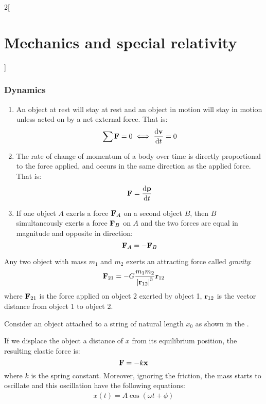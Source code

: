 \documentclass[../../../main_physics.tex]{subfiles}
\begin{document}
\begin{multicols}{2}[\section{Mechanics and special relativity}]
  \subsubsection{Dynamics}
  \begin{law}
    \hfill
    \begin{enumerate}
      \item An object at rest will stay at rest and an object in motion will stay in motion unless acted on by a net external force. That is: $$\sum\boldsymbol{\mathrm{F}}=0\iff\dv{\boldsymbol{\mathrm{v}}}{t}=0$$
      \item The rate of change of momentum of a body over time is directly proportional to the force applied, and occurs in the same direction as the applied force. That is: $$\boldsymbol{\mathrm{F}}=\dv{\boldsymbol{\mathrm{p}}}{t}$$
      \item If one object $A$ exerts a force $\boldsymbol{\mathrm{F}}_A$ on a second object $B$, then $B$ simultaneously exerts a force $\boldsymbol{\mathrm{F}}_B$ on $A$ and the two forces are equal in magnitude and opposite in direction: $$\boldsymbol{\mathrm{F}}_A=-\boldsymbol{\mathrm{F}}_B$$
    \end{enumerate}
  \end{law}
  \begin{proposition}
    Any two object with mass $m_1$ and $m_2$ exerts an attracting force called \emph{gravity}:
    $$\boldsymbol{\mathrm{F}}_{21}=-G\frac{m_1m_2}{{|\boldsymbol{\mathrm{r}}_{12}|}^3}\boldsymbol{\mathrm{r}}_{12}$$
    where $\boldsymbol{\mathrm{F}}_{21}$ is the force applied on object 2 exerted by object 1, $\boldsymbol{\mathrm{r}}_{12}$ is the vector distance from object 1 to object 2.
  \end{proposition}
  \begin{proposition}
    Consider an object attached to a string of natural length $x_0$ as shown in the .
    \begin{center}
      \begin{minipage}{\linewidth}
        \centering
        
        \label{MSR_elastic_force}
      \end{minipage}
    \end{center}
    If we displace the object a distance of $x$ from its equilibrium position, the resulting elastic force is: $$\boldsymbol{\mathrm{F}}=-k\boldsymbol{\mathrm{x}}$$ where $k$ is the spring constant. Moreover, ignoring the friction, the mass starts to oscillate and this oscillation have the following equations:
    \begin{gather*}
      x(t)=A\cos(\omega t+\phi)\\

\end{gather*}
\end{proposition}
\end{multicols}
\end{document}
